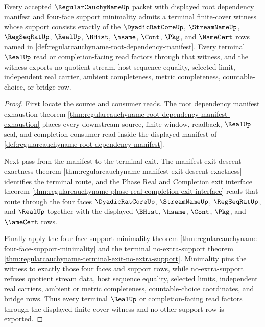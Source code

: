 \begin{theorem}
\label{thm:regularcauchyname-terminal-finite-cover-witness}
Every accepted $\RegularCauchyNameUp$ packet with displayed root dependency manifest and four-face support minimality admits a terminal finite-cover witness whose support consists exactly of the $\DyadicRatCoreUp$, $\StreamNameUp$, $\RegSeqRatUp$, $\RealUp$, $\BHist$, $\hsame$, $\Cont$, $\Pkg$, and $\NameCert$ rows named in \autoref{def:regularcauchyname-root-dependency-manifest}. Every terminal $\RealUp$ read or completion-facing read factors through that witness, and the witness exports no quotient stream, host sequence equality, selected limit, independent real carrier, ambient completeness, metric completeness, countable-choice, or bridge row.
\end{theorem}
\begin{proof}
First locate the source and consumer reads. The root dependency manifest exhaustion theorem \autoref{thm:regularcauchyname-root-dependency-manifest-exhaustion} places every downstream source, finite-window, readback, $\RealUp$ seal, and completion consumer read inside the displayed manifest of \autoref{def:regularcauchyname-root-dependency-manifest}.

Next pass from the manifest to the terminal exit. The manifest exit descent exactness theorem \autoref{thm:regularcauchyname-manifest-exit-descent-exactness} identifies the terminal route, and the Phase Real and Completion exit interface theorem \autoref{thm:regularcauchyname-phase-real-completion-exit-interface} reads that route through the four faces $\DyadicRatCoreUp$, $\StreamNameUp$, $\RegSeqRatUp$, and $\RealUp$ together with the displayed $\BHist$, $\hsame$, $\Cont$, $\Pkg$, and $\NameCert$ rows.

Finally apply the four-face support minimality theorem \autoref{thm:regularcauchyname-four-face-support-minimality} and the terminal no-extra-support theorem \autoref{thm:regularcauchyname-terminal-exit-no-extra-support}. Minimality pins the witness to exactly those four faces and support rows, while no-extra-support refuses quotient stream data, host sequence equality, selected limits, independent real carriers, ambient or metric completeness, countable-choice coordinates, and bridge rows. Thus every terminal $\RealUp$ or completion-facing read factors through the displayed finite-cover witness and no other support row is exported.
\end{proof}
